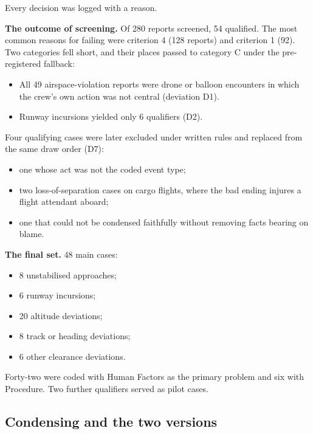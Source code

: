 \documentclass[11pt]{article}
\providecommand{\tightlist}{\setlength{\itemsep}{0pt}\setlength{\parskip}{0pt}}
\begin{document}
Every decision was logged with a reason.

\textbf{The outcome of screening.} Of 280 reports screened, 54 qualified. The most common reasons for failing were criterion 4 (128 reports) and criterion 1 (92). Two categories fell short, and their places passed to category C under the pre-registered fallback:

\begin{itemize}
\tightlist
\item
  All 49 airspace-violation reports were drone or balloon encounters in which the crew's own action was not central (deviation D1).
\item
  Runway incursions yielded only 6 qualifiers (D2).
\end{itemize}

Four qualifying cases were later excluded under written rules and replaced from the same draw order (D7):

\begin{itemize}
\tightlist
\item
  one whose act was not the coded event type;
\item
  two loss-of-separation cases on cargo flights, where the bad ending injures a flight attendant aboard;
\item
  one that could not be condensed faithfully without removing facts bearing on blame.
\end{itemize}

\textbf{The final set.} 48 main cases:

\begin{itemize}
\tightlist
\item
  8 unstabilised approaches;
\item
  6 runway incursions;
\item
  20 altitude deviations;
\item
  8 track or heading deviations;
\item
  6 other clearance deviations.
\end{itemize}

Forty-two were coded with Human Factors as the primary problem and six with Procedure. Two further qualifiers served as pilot cases.

\hypertarget{condensing-and-the-two-versions}{%
\subsection{Condensing and the two versions}\label{condensing-and-the-two-versions}}
\end{document}
